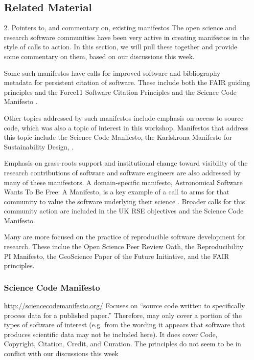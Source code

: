 \documentclass[a4paper,UKenglish]{dagman}
\renewcommand{\paragraph}[1]{\subsubsection*{#1}\xspace}
\begin{document}
\begin{appendix}
\section{Related Material}

2. Pointers to, and commentary on, existing manifestos
The open science and research software communities have been very active in creating manifestos in the style of calls to action. In this section, we will pull these together and provide some commentary on them, based on our discussions this week.

Some such manifestos have calls for improved software and bibliography metadata for persistent citation of software. These include both the FAIR guiding principles and the Force11 Software Citation Principles and the Science Code Manifesto \cite{wilkinson_fair_2016,arfon_m._smith_software_2016,nick_barnes_science_2013}.

Other topics addressed by such manifestos include emphasis on access to source code, which was also a topic of interest in this workshop. Manifestos that address this topic include the Science Code Manifesto, the Karlskrona Manifesto for Sustainability Design, . 

Emphasis on grass-roots support and institutional change toward visibility of the research contributions of software and software engineers are also addressed by many of these manifestors. A domain-specific manifesto, Astronomical Software Wants To Be Free: A Manifesto, is a key example of a call to arms for that community to value the software underlying their science \cite{weiner_astronomical_2009}. Broader calls for this community action are included in the  UK RSE objectives and the Science Code Manifesto.

Many are more focused on the practice of reproducible software development for research. These inclue the Open Science Peer Review Oath, the Reproducibility PI Manifesto, the GeoScience Paper of the Future Initiative, and the FAIR principles. 


\paragraph{Science Code Manifesto}
\url{http://sciencecodemanifesto.org/}\cite{nick_barnes_science_2013}
Focuses on ``source code written to specifically process data for a published paper.''
Therefore, may only cover a portion of the types of software of interest (e.g. from the wording it appears that software that produces scientific data may not be included here).
It does cover Code, Copyright, Citation, Credit, and Curation.
The principles do not seem to be in conflict with our discussions this week


\end{appendix}
\end{document}
